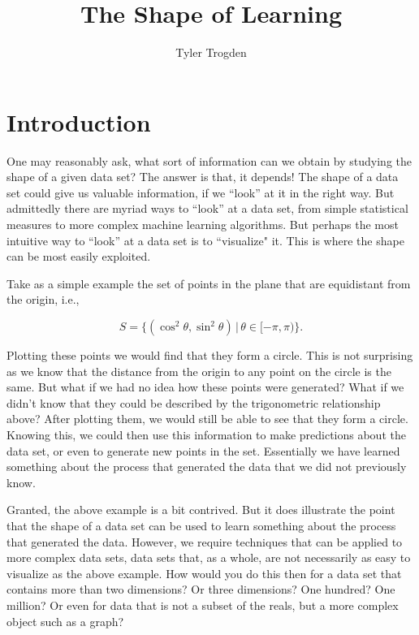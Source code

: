 \documentclass{IEEEcsmag}
\begin{document}
\setcounter{page}{1}
\title{The Shape of Learning}

\author{Tyler Trogden}


\begin{abstract}
\end{abstract}

\maketitle

\chapterinitial{}


\section{Introduction}
  One may reasonably ask, what sort of information can we obtain by studying the
  shape of a given data set? The answer is that, it depends! The shape of a data set
  could give us valuable information, if we ``look'' at it in the right way. But admittedly
  there are myriad ways to ``look'' at a data set, from simple statistical measures
  to more complex machine learning algorithms. But perhaps the most intuitive way
  to ``look'' at a data set is to ``visualize" it. This is where the shape can be
  most easily exploited.
  
  Take as a simple example the set of points in the plane that are equidistant from 
  the origin, i.e., 
  
  \[
    S = \Big\{ (\cos^2 \theta, \sin^2 \theta) \,\big|\, \theta \in [-\pi, \pi) \Big\}.
  \]

  Plotting these points we would find that they form a circle. This is not surprising
  as we know that the distance from the origin to any point on the circle is the same.
  But what if we had no idea how these points were generated? What if we didn't know
  that they could be described by the trigonometric relationship above? After plotting
  them, we would still be able to see that they form a circle. Knowing this, we could
  then use this information to make predictions about the data set, or even to generate
  new points in the set. Essentially we have learned something about the process that
  generated the data that we did not previously know.

  Granted, the above example is a bit contrived. But it does illustrate the point that
  the shape of a data set can be used to learn something about the process that generated
  the data. However, we require techniques that can be applied to more complex data sets,
  data sets that, as a whole, are not necessarily as easy to visualize as the above example.
  How would you do this then for a data set that contains more than two dimensions? Or three 
  dimensions? One hundred? One million? Or even for data that is not a subset of the reals,
  but a more complex object such as a graph? 
\end{document}
